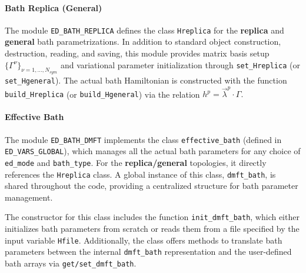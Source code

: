 \documentclass[edipack2.tex]{subfiles}
\begin{document}
\paragraph{Bath Replica (General)}
The module {\tt ED\_BATH\_REPLICA} defines the class {\tt Hreplica} 
for the {\bf replica} and {\bf general} bath parametrizations. In 
addition to standard object construction, destruction, reading, and 
saving, this module provides matrix basis setup 
$\{ \Gamma^\nu \}_{\nu=1,\dots,N_{sym}}$ and variational parameter 
initialization through {\tt set\_Hreplica} (or {\tt set\_Hgeneral}). 
The actual bath Hamiltonian is constructed with the function 
{\tt build\_Hreplica} (or {\tt build\_Hgeneral}) via the relation
$
h^p = \vec{\lambda}^p \cdot \Gamma.
$



\paragraph{Effective Bath}
The module {\tt ED\_BATH\_DMFT} implements the class 
{\tt effective\_bath} (defined in {\tt ED\_VARS\_GLOBAL}), which 
manages all the actual bath parameters for any choice of 
{\tt ed\_mode} and {\tt bath\_type}. For the 
{\bf replica/general} topologies, it directly references the 
{\tt Hreplica} class. A global instance of this class, 
{\tt dmft\_bath}, is shared throughout the code, providing a 
centralized structure for bath parameter management.

The constructor for this class includes the function 
{\tt init\_dmft\_bath}, which either initializes bath parameters 
from scratch or reads them from a file specified by the input 
variable {\tt Hfile}. Additionally, the class offers methods to 
translate bath parameters between the internal {\tt dmft\_bath} 
representation and the user-defined bath arrays via 
{\tt get/set\_dmft\_bath}.
\end{document}
